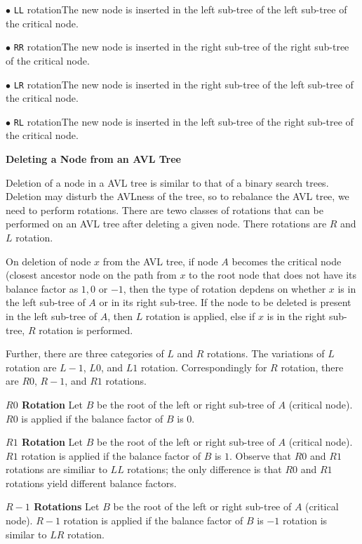 \vskip 1mm
$\bullet$ {\tt LL} rotation\qquad The new node is inserted in the left sub-tree of the left sub-tree of the critical node.

\vskip 3mm
$\bullet$ {\tt RR} rotation\qquad The new node is inserted in the right sub-tree of the right sub-tree of the critical node.

\vskip 3mm
$\bullet$ {\tt LR} rotation\qquad The new node is inserted in the right sub-tree of the left sub-tree of the critical node.

\vskip 3mm
$\bullet$ {\tt RL} rotation\qquad The new node is inserted in the left sub-tree of the right sub-tree of the critical node.

\vskip 3mm
{\bf Deleting a Node from an AVL Tree}

\vskip 1mm
Deletion of a node in a AVL tree is similar to that of a binary search trees. Deletion may disturb the AVLness of the tree, so to rebalance the AVL tree, we need to perform rotations. There are tewo classes of rotations that can be performed on an AVL tree after deleting a given node. There rotations are $R$ and $L$ rotation.

\vskip 1mm
On deletion of node $x$ from the AVL tree, if node $A$ becomes the critical node (closest ancestor node on the path from $x$ to the root node that does not have its balance factor as $1,0$ or $-1$, then the type of rotation depdens on whether $x$ is in the left sub-tree of $A$ or in its right sub-tree. If the node to be deleted is present in the left sub-tree of $A$, then $L$ rotation is applied, else if $x$ is in the right sub-tree, $R$ rotation is performed.

\vskip 1mm
Further, there are three categories of $L$ and $R$ rotations. The variations of $L$ rotation are $L-1$, $L0$, and $L1$ rotation. Correspondingly for $R$ rotation, there are $R0$, $R-1$, and $R1$ rotations.

\vskip 3mm
{\bf $R0$ Rotation}
\vskip 1mm
Let $B$ be the root of the left or right sub-tree of $A$ (critical node). $R0$ is applied if the balance factor of $B$ is $0$.

\vskip 3mm
{\bf $R1$ Rotation} 
\vskip 1mm
Let $B$ be the root of the left or right sub-tree of $A$ (critical node). $R1$ rotation is applied if the balance factor of $B$ is $1$. Observe that $R0$ and $R1$ rotations are similiar to $LL$ rotations; the only difference is that $R0$ and $R1$ rotations yield different balance factors.

\vskip 3mm
{\bf $R-1$ Rotations}
\vskip 1mm
Let $B$ be the root of the left or right sub-tree of $A$ (critical node). $R-1$ rotation is applied if the balance factor of $B$ is $-1$ rotation is similar to $LR$ rotation.

